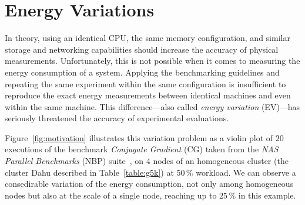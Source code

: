 








\section{Energy Variations}\label{sec:energy_variation}
In theory, using an identical CPU, the same memory configuration, and similar storage and networking capabilities should increase the accuracy of physical measurements.
Unfortunately, this is not possible when it comes to measuring the energy consumption of a system.
Applying the benchmarking guidelines and repeating the same experiment within the same configuration is insufficient to reproduce the exact energy measurements between identical machines and even within the same machine.
This difference---also called \emph{energy variation} (EV)---has seriously threatened the accuracy of experimental evaluations.

Figure~\ref{fig:motivation} illustrates this variation problem as a violin plot of $20$ executions of the benchmark \emph{Conjugate Gradient} (\textsf{CG}) taken from the \emph{NAS Parallel Benchmarks} (NBP) suite~\cite{Bailey:1991:NPB:125826.125925}, on $4$ nodes of an homogeneous cluster (the cluster \textsf{Dahu} described in Table~\ref{table:g5k}) at 50\,\% workload.
We can observe a consedirable variation of the energy consumption, not only among homogeneous nodes but also at the scale of a single node, reaching up to $25\,\%$ in this example.

